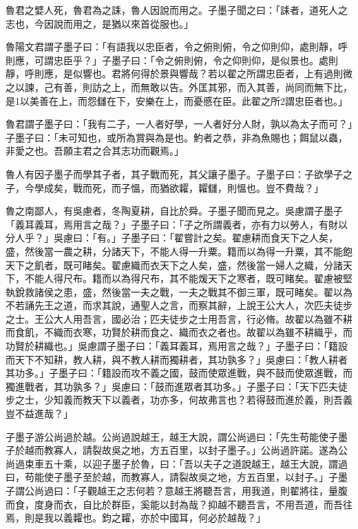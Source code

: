 \begin{pinyinscope}
魯君之嬖人死，魯君為之誄，魯人因說而用之。子墨子聞之曰：「誄者，道死人之志也，今因說而用之，是猶以來首從服也。」

魯陽文君謂子墨子曰：「有語我以忠臣者，令之俯則俯，令之仰則仰，處則靜，呼則應，可謂忠臣乎？」子墨子曰：「令之俯則俯，令之仰則仰，是似景也。處則靜，呼則應，是似響也。君將何得於景與響哉？若以翟之所謂忠臣者，上有過則微之以諫，己有善，則訪之上，而無敢以告。外匡其邪，而入其善，尚同而無下比，是1以美善在上，而怨讎在下，安樂在上，而憂慼在臣。此翟之所2謂忠臣者也。」

魯君謂子墨子曰：「我有二子，一人者好學，一人者好分人財，孰以為太子而可？」子墨子曰：「未可知也，或所為賞與為是也。魡者之恭，非為魚賜也；餌鼠以蟲，非愛之也。吾願主君之合其志功而觀焉。」

魯人有因子墨子而學其子者，其子戰而死，其父讓子墨子。子墨子曰：子欲學子之子，今學成矣，戰而死，而子慍，而猶欲糶，糶讎，則慍也。豈不費哉？」

魯之南鄙人，有吳慮者，冬陶夏耕，自比於舜。子墨子聞而見之。吳慮謂子墨子「義耳義耳，焉用言之哉？」子墨子曰：「子之所謂義者，亦有力以勞人，有財以分人乎？」吳慮曰：「有。」子墨子曰：「翟嘗計之矣。翟慮耕而食天下之人矣，盛，然後當一農之耕，分諸天下，不能人得一升粟。籍而以為得一升粟，其不能飽天下之飢者，既可睹矣。翟慮織而衣天下之人矣，盛，然後當一婦人之織，分諸天下，不能人得尺布。籍而以為得尺布，其不能煖天下之寒者，既可睹矣。翟慮被堅執銳救諸侯之患，盛，然後當一夫之戰，一夫之戰其不御三軍，既可睹矣。翟以為不若誦先王之道，而求其說，通聖人之言，而察其辭，上說王公大人，次匹夫徒步之士。王公大人用吾言，國必治；匹夫徒步之士用吾言，行必脩。故翟以為雖不耕而食飢，不織而衣寒，功賢於耕而食之、織而衣之者也。故翟以為雖不耕織乎，而功賢於耕織也。」吳慮謂子墨子曰：「義耳義耳，焉用言之哉？」子墨子曰：「籍設而天下不知耕，教人耕，與不教人耕而獨耕者，其功孰多？」吳慮曰：「教人耕者其功多。」子墨子曰：「籍設而攻不義之國，鼓而使眾進戰，與不鼓而使眾進戰，而獨進戰者，其功孰多？」吳慮曰：「鼓而進眾者其功多。」子墨子曰：「天下匹夫徒步之士，少知義而教天下以義者，功亦多，何故弗言也？若得鼓而進於義，則吾義豈不益進哉？」

子墨子游公尚過於越。公尚過說越王，越王大說，謂公尚過曰：「先生苟能使子墨子於越而教寡人，請裂故吳之地，方五百里，以封子墨子。」公尚過許諾。遂為公尚過束車五十乘，以迎子墨子於魯，曰：「吾以夫子之道說越王，越王大說，謂過曰，苟能使子墨子至於越，而教寡人，請裂故吳之地，方五百里，以封子。」子墨子謂公尚過曰：「子觀越王之志何若？意越王將聽吾言，用我道，則翟將往，量腹而食，度身而衣，自比於群臣，奚能以封為哉？抑越不聽吾言，不用吾道，而吾往焉，則是我以義糶也。鈞之糶，亦於中國耳，何必於越哉？」


\end{pinyinscope}
